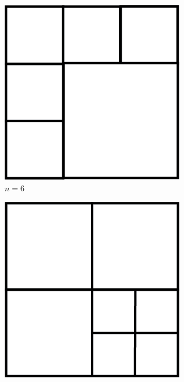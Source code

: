 \documentclass[12pt]{article}
\begin{document}
\begin{figure}[h]
     \centering
     \begin{subfigure}[b]{0.3\textwidth}
         \centering
         \includegraphics[width=\textwidth]{GRAPH5}
         \caption{$n=6$}
     \end{subfigure}
     \hfill
     \begin{subfigure}[b]{0.3\textwidth}
         \centering
         \includegraphics[width=\textwidth]{GRAPH4}

\end{subfigure}
\end{figure}
\end{document}
